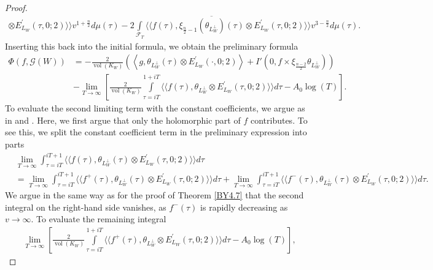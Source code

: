 \documentclass{amsart}
\theoremstyle{definition}
\theoremstyle{definition}
\theoremstyle{definition}
\begin{document}
\begin{proof}
\begin{align*}
\otimes E_{L_W}^{\prime}(\tau, 0; 2) \rangle \rangle v^{1 + \frac{n}{2}} d \mu(\tau)
-2 \int\limits_{\mathcal{F}_T}
\langle \langle f(\tau), \overline{\xi_{\frac{n}{2}-1}(\theta_{L_W^{\perp}})(\tau)} \otimes E_{L_W}^{\prime}(\tau, 0; 2) \rangle \rangle v^{3 - \frac{n}{2}} d \mu (\tau). \end{align*}
Inserting this back into the initial formula, we obtain the preliminary formula
\begin{align*} \Phi(f, \mathcal{G}(W)) 
&= - \frac{2}{\operatorname{vol}(K_W)} \left(  \left\langle g, \theta_{L_W^{\perp}}(\tau) \otimes E_{L_W}^{\prime}(\cdot, 0; 2) \right\rangle
+ I' \left( 0, f \times \xi_{\frac{n-2}{2}} \theta_{L_W^{\perp}} \right) \right) \\
&- \lim_{T \rightarrow \infty} \left[ \frac{2}{\operatorname{vol}(K_W) }  \int\limits_{\tau = iT}^{1 + iT} \langle \langle f(\tau), \theta_{L_W^{\perp}} 
\otimes E_{L_W}^{\prime}(\tau, 0; 2) \rangle \rangle d \tau  - A_0 \log(T)  \right]. \end{align*} 
To evaluate the second limiting term with the constant coefficients, we argue as in \cite[Theorem 4.7]{BY} and \cite[Theorem 4.15]{VO}.
Here, we first argue that only the holomorphic part of $f$ contributes. 
To see this, we split the constant coefficient term in the preliminary expression into parts 
\begin{equation*}\begin{aligned} &\lim_{T \rightarrow \infty} \int_{\tau = i T}^{iT +1} 
\langle \langle f(\tau), \theta_{L_W^{\perp}}(\tau) \otimes E^{\prime}_{L_W}(\tau, 0; 2)\rangle \rangle d \tau \\
&= \lim_{T \rightarrow \infty} \int_{\tau = i T}^{iT +1} 
\langle \langle f^+(\tau), \theta_{L_W^{\perp}}(\tau) \otimes E^{\prime }_{L_W}(\tau, 0; 2)\rangle \rangle d \tau + \lim_{T \rightarrow \infty} 
\int_{\tau = i T}^{iT +1} \langle \langle f^-(\tau), \theta_{L_W^{\perp}}(\tau) \otimes E^{\prime}_{L_W}(\tau, 0; 2)\rangle \rangle d \tau. \end{aligned}\end{equation*}
We argue in the same way as for the proof of Theorem \ref{BY4.7} that the second integral on the right-hand side vanishes,
as $f^-(\tau)$ is rapidly decreasing as $v \rightarrow \infty$. To evaluate the remaining integral
\begin{equation*}\begin{aligned} \lim_{T \rightarrow \infty} \left[ \frac{2}{\operatorname{vol}(K_W) }  
\int\limits_{\tau = iT}^{1 + iT} \langle \langle f^+(\tau), \theta_{L_W^{\perp}} \otimes E_{L_W}^{\prime}(\tau, 0; 2) \rangle \rangle d \tau  - A_0 \log(T)  \right], \end{aligned}\end{equation*} 

\end{proof}
\end{document}
